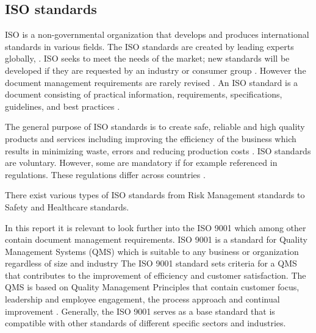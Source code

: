 \subsection{ISO standards} \label{sec:ISOstandards}
ISO is a non-governmental organization that develops and produces international standards in various fields.
The ISO standards are created by leading experts globally, %
\cite{ISOinfo}.
ISO seeks to meet the needs of the market; new standards will be developed if they are requested by an industry or consumer group \cite{ISOdeveloping}.
However the document management requirements are rarely revised \cite{Ipsenfirstinterview}.
An ISO standard is a document consisting of practical information, requirements, specifications, guidelines, and best practices \cite{ISOreviewedevery5years}.

The general purpose of ISO standards is to create safe, reliable and high quality products and services including improving the efficiency of the business which results in minimizing waste, errors and reducing production costs \cite{ISOinfo}. %
ISO standards are voluntary.
However, some are mandatory if for example referenced in regulations.
These regulations differ across countries \cite{ISOreviewedevery5years}.

There exist various types of ISO standards from Risk Management standards to Safety and Healthcare standards.


In this report it is relevant to look further into the ISO 9001 which among other contain document management requirements.
ISO 9001 is a standard for Quality Management Systems (QMS) which is suitable to any business or organization regardless of size and industry \cite{ISO9001}
The ISO 9001 standard sets criteria for a QMS that contributes to the improvement of efficiency and customer satisfaction.
The QMS is based on Quality Management Principles that contain customer focus, leadership and employee engagement, the process approach and continual improvement \cite{ISO9001-2}.
Generally, the ISO 9001 serves as a base standard that is compatible with other standards of different specific sectors and industries.

